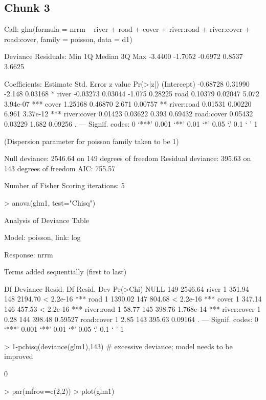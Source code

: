 \documentclass{article}
\begin{document}
\subsection{Chunk 3}
\begin{Schunk}
\begin{Soutput}
Call:
glm(formula = nrrm ~ river + road + cover + river:road + river:cover + 
    road:cover, family = poisson, data = d1)

Deviance Residuals: 
    Min       1Q   Median       3Q      Max  
-3.4400  -1.7052  -0.6972   0.8537   3.6625  

Coefficients:
            Estimate Std. Error z value Pr(>|z|)    
(Intercept) -0.68728    0.31990  -2.148  0.03168 *  
river       -0.03273    0.03044  -1.075  0.28225    
road         0.10379    0.02047   5.072 3.94e-07 ***
cover        1.25168    0.46870   2.671  0.00757 ** 
river:road   0.01531    0.00220   6.961 3.37e-12 ***
river:cover  0.01423    0.03622   0.393  0.69432    
road:cover   0.05432    0.03229   1.682  0.09256 .  
---
Signif. codes:  0 ‘***’ 0.001 ‘**’ 0.01 ‘*’ 0.05 ‘.’ 0.1 ‘ ’ 1

(Dispersion parameter for poisson family taken to be 1)

    Null deviance: 2546.64  on 149  degrees of freedom
Residual deviance:  395.63  on 143  degrees of freedom
AIC: 755.57

Number of Fisher Scoring iterations: 5
\end{Soutput}
\begin{Sinput}
> anova(glm1, test="Chisq")
\end{Sinput}
\begin{Soutput}
Analysis of Deviance Table

Model: poisson, link: log

Response: nrrm

Terms added sequentially (first to last)


            Df Deviance Resid. Df Resid. Dev  Pr(>Chi)    
NULL                          149    2546.64              
river        1   351.94       148    2194.70 < 2.2e-16 ***
road         1  1390.02       147     804.68 < 2.2e-16 ***
cover        1   347.14       146     457.53 < 2.2e-16 ***
river:road   1    58.77       145     398.76 1.768e-14 ***
river:cover  1     0.28       144     398.48   0.59527    
road:cover   1     2.85       143     395.63   0.09164 .  
---
Signif. codes:  0 ‘***’ 0.001 ‘**’ 0.01 ‘*’ 0.05 ‘.’ 0.1 ‘ ’ 1
\end{Soutput}
\begin{Sinput}
> 1-pchisq(deviance(glm1),143) # excessive deviance; model needs to be improved
\end{Sinput}
\begin{Soutput}
[1] 0
\end{Soutput}
\begin{Sinput}
> par(mfrow=c(2,2))
> plot(glm1)
\end{Sinput}
\end{Schunk}
\end{document}
